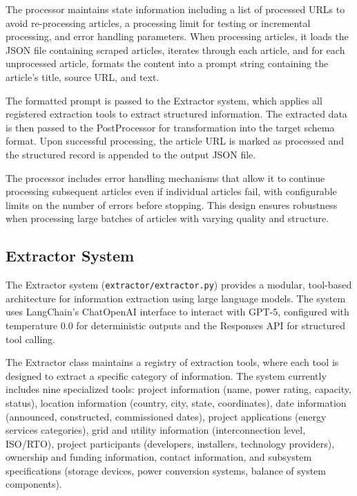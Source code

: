 \documentclass[11pt]{article}
\begin{document}
The processor maintains state information including a list of processed URLs to avoid re-processing articles, a processing limit for testing or incremental processing, and error handling parameters. When processing articles, it loads the JSON file containing scraped articles, iterates through each article, and for each unprocessed article, formats the content into a prompt string containing the article's title, source URL, and text.

The formatted prompt is passed to the Extractor system, which applies all registered extraction tools to extract structured information. The extracted data is then passed to the PostProcessor for transformation into the target schema format. Upon successful processing, the article URL is marked as processed and the structured record is appended to the output JSON file.

The processor includes error handling mechanisms that allow it to continue processing subsequent articles even if individual articles fail, with configurable limits on the number of errors before stopping. This design ensures robustness when processing large batches of articles with varying quality and structure.

\subsection{Extractor System}

The Extractor system (\texttt{extractor/extractor.py}) provides a modular, tool-based architecture for information extraction using large language models. The system uses LangChain's ChatOpenAI interface to interact with GPT-5, configured with temperature 0.0 for deterministic outputs and the Responses API for structured tool calling.

The Extractor class maintains a registry of extraction tools, where each tool is designed to extract a specific category of information. The system currently includes nine specialized tools: project information (name, power rating, capacity, status), location information (country, city, state, coordinates), date information (announced, constructed, commissioned dates), project applications (energy services categories), grid and utility information (interconnection level, ISO/RTO), project participants (developers, installers, technology providers), ownership and funding information, contact information, and subsystem specifications (storage devices, power conversion systems, balance of system components).
\end{document}
